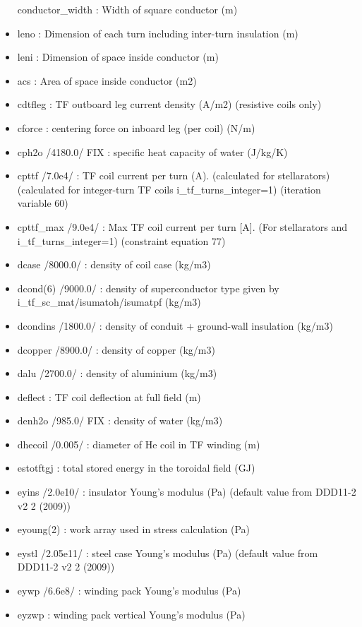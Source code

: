 \documentclass[]{article}
\begin{document}
\begin{itemize}
  conductor\_width : Width of square conductor (m)
\item
  leno : Dimension of each turn including inter-turn insulation (m)
\item
  leni : Dimension of space inside conductor (m)
\item
  acs : Area of space inside conductor (m2)
\item
  cdtfleg : TF outboard leg current density (A/m2) (resistive coils
  only)
\item
  cforce : centering force on inboard leg (per coil) (N/m)
\item
  cph2o /4180.0/ FIX : specific heat capacity of water (J/kg/K)
\item
  cpttf /7.0e4/ : TF coil current per turn (A). (calculated for
  stellarators) (calculated for integer-turn TF coils
  i\_tf\_turns\_integer=1) (iteration variable 60)
\item
  cpttf\_max /9.0e4/ : Max TF coil current per turn {[}A{]}. (For
  stellarators and i\_tf\_turns\_integer=1) (constraint equation 77)
\item
  dcase /8000.0/ : density of coil case (kg/m3)
\item
  dcond(6) /9000.0/ : density of superconductor type given by
  i\_tf\_sc\_mat/isumatoh/isumatpf (kg/m3)
\item
  dcondins /1800.0/ : density of conduit + ground-wall insulation
  (kg/m3)
\item
  dcopper /8900.0/ : density of copper (kg/m3)
\item
  dalu /2700.0/ : density of aluminium (kg/m3)
\item
  deflect : TF coil deflection at full field (m)
\item
  denh2o /985.0/ FIX : density of water (kg/m3)
\item
  dhecoil /0.005/ : diameter of He coil in TF winding (m)
\item
  estotftgj : total stored energy in the toroidal field (GJ)
\item
  eyins /2.0e10/ : insulator Young's modulus (Pa) (default value from
  DDD11-2 v2 2 (2009))
\item
  eyoung(2) : work array used in stress calculation (Pa)
\item
  eystl /2.05e11/ : steel case Young's modulus (Pa) (default value from
  DDD11-2 v2 2 (2009))
\item
  eywp /6.6e8/ : winding pack Young's modulus (Pa)
\item
  eyzwp : winding pack vertical Young's modulus (Pa)

\end{itemize}
\end{document}
